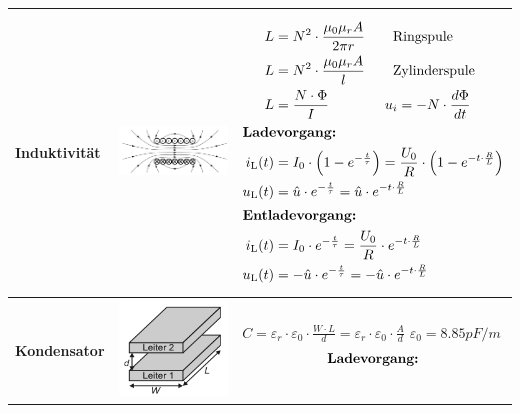 \begin{longtable}{|>{\bfseries}p{3cm}|c|p{10cm}|}
    \\ \hline
    Induktivität
    & \includegraphics[width=4cm, valign=t]{pictures/induktivitaet.png}
    & {\begin{align*}
    		L &=N^2\cdot\frac{\mu_{0}\mu_{r}A}{2\pi r} \qquad \text{Ringspule} \\
    		L &=N^2\cdot\frac{\mu_{0}\mu_{r}A}{l} \qquad \text{Zylinderspule} \\
    		L &=\frac{N\cdot\Phi}{I} \qquad \qquad u_{i} =-N\cdot\frac{d\Phi}{dt}\\
    		\intertext{\textbf{Ladevorgang:}}
    		i_{\mathrm{L}} (t) &= I_0 \cdot \left( 1 - e^{-\frac{t}{\tau}}\right) = \frac{U_0}{R} \cdot \left( 1 -e^{-t\cdot \frac{R}{L}}\right) \\
    		u_{\mathrm{L}} (t) &= \hat u \cdot e^{-\frac{t}{\tau}} = \hat u \cdot e^{-t \cdot\frac{R}{L}}\\
    		\intertext{\textbf{Entladevorgang:}}
    		i_{\mathrm{L}} (t) &= I_0 \cdot e^{- \frac{t}{\tau}} = \frac{U_0}{R} \cdot e^{- t \cdot\frac{R}{L}}\\
    		u_{\mathrm{L}} (t) &= - \hat u \cdot e^{- \frac{t}{\tau}} = - \hat u \cdot e^{- t \cdot\frac{R}{L}}
    	\end{align*}
    }
    \\ \hline
    Kondensator
    & \includegraphics[width=4cm, valign=t]{pictures/kapazitaetswert.png}
    & {$C=\varepsilon_{r}\cdot \varepsilon_{0}\cdot \frac{W\cdot L}{d}=\varepsilon_{r}\cdot \varepsilon_{0}\cdot \frac{A}{d}$ \qquad $\varepsilon_{0}= 8.85 pF/m$\newline
       \newline
       \begin{align*}
           \intertext{\textbf{Ladevorgang:}}

\end{align*}}
\end{longtable}
